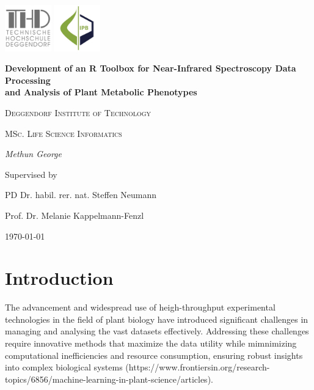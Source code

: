 \documentclass[12pt,a4paper]{report}
\begin{document}
\begin{titlepage}
    \centering
    \begin{flushright}
        \centering
        \includegraphics[width=2cm]{images/thd.png} %
        \hspace{0cm} %
        \includegraphics[width=2cm]{images/ipb.jpg} %
    \end{flushright}
    {\huge\bfseries Development of an R Toolbox for Near-Infrared Spectroscopy Data Processing \\
    and Analysis of Plant Metabolic Phenotypes\par}
    \vspace{2cm}
    {\LARGE \textsc{Deggendorf Institute of Technology}\par}
    \vspace{1cm}
    {\Large \textsc{MSc. Life Science Informatics}\par}
    \vspace{1.5cm}
    {\Large\itshape Methun George\par}
    \vfill
    Supervised by\par
    PD Dr. habil. rer. nat. Steffen Neumann\par
    Prof. Dr. Melanie Kappelmann-Fenzl
    \vfill
    {\large \today\par}
\end{titlepage}

\newpage
\tableofcontents
\newpage


\chapter{Introduction}
The advancement and widespread use of heigh-throughput experimental 
technologies in the field of plant biology have introduced significant 
challenges in managing and analysing the vast datasets effectively. Addressing
these challenges require innovative methods that maximize the data utility 
while mimnimizing computational inefficiencies and resource consumption, ensuring
robust insights into complex biological systems (https://www.frontiersin.org/research-topics/6856/machine-learning-in-plant-science/articles).
\end{document}
